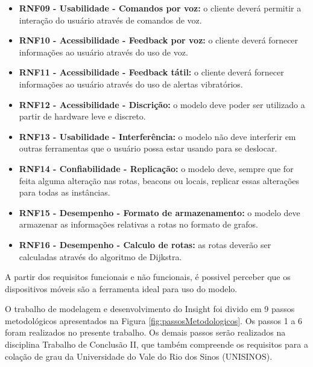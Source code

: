 \documentclass[english,brazilian]{UNISINOSmonografia}
\begin{document}
\begin{itemize}
	\item \textbf{RNF09 - Usabilidade - Comandos por voz:} o cliente deverá permitir a interação do usuário através de comandos de voz.

	\item \textbf{RNF10 - Acessibilidade - Feedback por voz:} o cliente deverá fornecer informações ao usuário através do uso de voz.

	\item \textbf{RNF11 - Acessibilidade - Feedback tátil:} o cliente deverá fornecer informações ao usuário através do uso de alertas vibratórios.

	\item \textbf{RNF12 - Acessibilidade - Discrição:} o modelo deve poder ser utilizado a partir de hardware leve e discreto.

	\item \textbf{RNF13 - Usabilidade - Interferência:} o modelo não deve interferir em outras ferramentas que o usuário possa estar usando para se deslocar.

	\item \textbf{RNF14 - Confiabilidade - Replicação:} o modelo deve, sempre que for feita alguma alteração nas rotas, beacons ou locais, replicar essas alterações para todas as instâncias.

	\item \textbf{RNF15 - Desempenho - Formato de armazenamento:} o modelo deve armazenar as informações relativas a rotas no formato de grafos.

	\item \textbf{RNF16 - Desempenho - Calculo de rotas:} as rotas deverão ser calculadas através do algoritmo de Dijkstra.

\end{itemize}

A partir dos requisitos funcionais e não funcionais, é possivel perceber que os dispositivos móveis são a ferramenta ideal para uso do modelo.

O trabalho de modelagem e desenvolvimento do Insight foi divido em 9 passos metodológicos apresentados na Figura \ref{fig:passosMetodologicos}. Os passos 1 a 6 foram realizados no presente trabalho. Os demais passos serão realizados na disciplina Trabalho de Conclusão II, que também compreende os requisitos para a colação de grau da Universidade do Vale do Rio dos Sinos (UNISINOS).
\end{document}
